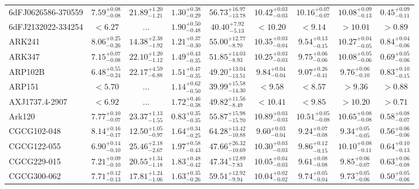 \documentclass[onecolumn]{mn2e}
\begin{document}
{\begin{center}
\begin{longtable}{lcccccccc}
6dFJ0626586-370559 & $7.59_{-0.08}^{+0.08}$ & $21.89_{-1.21}^{+1.20}$ & $1.30_{-0.29}^{+0.38}$ &$56.73_{-13.78}^{+16.97}$ & $10.42_{-0.03}^{+0.03}$ & $10.16_{-0.07}^{+0.07}$ & $10.08_{-0.13}^{+0.09}$ & $0.45_{-0.11}^{+0.09}$ \\
6dFJ2132022-334254 & $<6.27$ & ... & $1.90_{-0.48}^{+0.50}$ &$40.40_{-5.13}^{+7.92}$ & $<10.20$ & $<9.14$ & $>10.01$ & $>0.89$ \\
ARK241 & $8.06_{-0.26}^{+0.25}$ & $14.38_{-1.92}^{+2.38}$ & $1.21_{-0.30}^{+0.37}$ &$55.00_{-8.70}^{+12.77}$ & $10.35_{-0.04}^{+0.03}$ & $9.54_{-0.15}^{+0.13}$ & $10.27_{-0.05}^{+0.04}$ & $0.84_{-0.06}^{+0.04}$ \\
ARK347 & $7.15_{-0.08}^{+0.07}$ & $22.10_{-1.12}^{+1.20}$ & $1.49_{-0.35}^{+0.43}$ &$51.85_{-8.93}^{+14.03}$ & $10.25_{-0.03}^{+0.03}$ & $9.75_{-0.06}^{+0.06}$ & $10.08_{-0.06}^{+0.05}$ & $0.69_{-0.06}^{+0.05}$ \\
ARP102B & $6.48_{-0.24}^{+0.55}$ & $22.17_{-6.88}^{+4.59}$ & $1.51_{-0.35}^{+0.47}$ &$49.20_{-13.51}^{+13.04}$ & $9.84_{-0.04}^{+0.04}$ & $9.07_{-0.41}^{+0.26}$ & $9.76_{-0.10}^{+0.06}$ & $0.83_{-0.15}^{+0.10}$ \\
ARP151 & $<5.70$ & ... & $1.14_{-0.50}^{+0.62}$ &$39.99_{-14.30}^{+15.58}$ & $<9.58$ & $<8.57$ & $>9.36$ & $>0.88$ \\
AXJ1737.4-2907 & $<6.92$ & ... & $1.72_{-0.38}^{+0.46}$ &$49.82_{-8.49}^{+11.56}$ & $<10.41$ & $<9.85$ & $>10.20$ & $>0.71$ \\
Ark120 & $7.77_{-0.07}^{+0.10}$ & $23.37_{-1.55}^{+1.13}$ & $0.83_{-0.35}^{+0.35}$ &$55.87_{-15.70}^{+15.98}$ & $10.89_{-0.03}^{+0.03}$ & $10.51_{-0.08}^{+0.05}$ & $10.65_{-0.08}^{+0.08}$ & $0.58_{-0.07}^{+0.08}$ \\
CGCG102-048 & $8.14_{-0.17}^{+0.16}$ & $12.50_{-0.97}^{+1.05}$ & $1.64_{-0.25}^{+0.34}$ &$64.28_{-10.88}^{+13.42}$ & $9.60_{-0.04}^{+0.03}$ & $9.24_{-0.08}^{+0.07}$ & $9.34_{-0.05}^{+0.05}$ & $0.56_{-0.06}^{+0.06}$ \\
CGCG122-055 & $6.90_{-0.10}^{+0.14}$ & $25.46_{-2.67}^{+2.18}$ & $1.97_{-0.43}^{+0.58}$ &$47.66_{-10.69}^{+26.32}$ & $10.30_{-0.03}^{+0.03}$ & $9.86_{-0.15}^{+0.12}$ & $10.10_{-0.11}^{+0.08}$ & $0.64_{-0.13}^{+0.10}$ \\
CGCG229-015 & $7.21_{-0.10}^{+0.09}$ & $20.55_{-1.18}^{+1.34}$ & $1.83_{-0.42}^{+0.48}$ &$47.34_{-7.83}^{+12.89}$ & $10.05_{-0.03}^{+0.04}$ & $9.61_{-0.08}^{+0.08}$ & $9.85_{-0.07}^{+0.06}$ & $0.63_{-0.08}^{+0.06}$ \\
CGCG300-062 & $7.71_{-0.13}^{+0.12}$ & $17.81_{-1.06}^{+1.24}$ & $1.63_{-0.26}^{+0.35}$ &$59.51_{-9.94}^{+12.92}$ & $10.04_{-0.02}^{+0.02}$ & $9.74_{-0.04}^{+0.05}$ & $9.73_{-0.06}^{+0.05}$ & $0.50_{-0.06}^{+0.05}$ \\

\end{longtable}
\end{center}}
\end{document}
